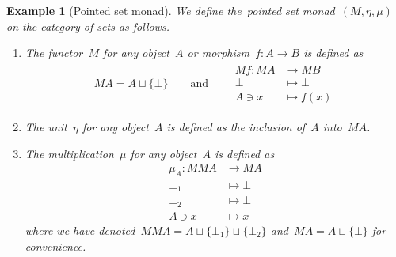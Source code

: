 \documentclass[a4paper]{article}
\theoremstyle{plain}
\newtheorem{example}[theorem]{Example}
\theoremstyle{definition}
\begin{document}
\begin{example}[Pointed set monad]
    \label{monad:maybe}
    We define the~\emph{pointed set monad}~\((M,\eta,\mu)\) on the category of
    sets as follows.
    \begin{enumerate}
        \item The functor~\(M\) for any object~\(A\) or
            morphism~\(f:A\longrightarrow B\) is defined as
            \begin{gather*}
                MA = A\sqcup\{\bot\}
                \qquad\text{and}\qquad
                \begin{split}
                    Mf:MA&\longrightarrow MB \\
                    \bot&\longmapsto\bot \\
                    A\ni x&\longmapsto f(x)
                \end{split}
            \end{gather*}
        \item The unit~\(\eta\) for any object~\(A\) is defined as the inclusion
            of~\(A\) into~\(MA\).
        \item The multiplication~\(\mu\) for any object~\(A\) is defined as
            \begin{align*}
                \mu_{A}:MMA&\longrightarrow MA \\
                \bot_{1}&\longmapsto \bot \\
                \bot_{2}&\longmapsto \bot \\
                A\ni x&\longmapsto x
            \end{align*}
            where we have denoted~\(MMA=A\sqcup\{\bot_{1}\}\sqcup\{\bot_{2}\}\)
            and~\(MA=A\sqcup\{\bot\}\) for convenience.
    \end{enumerate}
\end{example}
\end{document}
